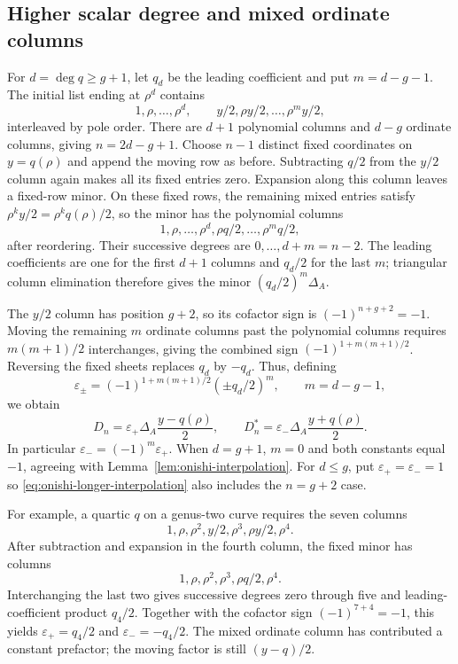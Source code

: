 \documentclass[11pt]{article}
\begin{document}
\subsection{Higher scalar degree and mixed ordinate columns}\label{sec:longer-columns}

For $d=\deg q\ge g+1$, let $q_d$ be the leading coefficient and put $m=d-g-1$. The initial list ending at $\rho^d$ contains
\[
1,\rho,\ldots,\rho^d,\qquad y/2,\rho y/2,\ldots,\rho^m y/2,
\]
interleaved by pole order. There are $d+1$ polynomial columns and $d-g$ ordinate columns, giving $n=2d-g+1$. Choose $n-1$ distinct fixed coordinates on $y=q(\rho)$ and append the moving row as before. Subtracting $q/2$ from the $y/2$ column again makes all its fixed entries zero. Expansion along this column leaves a fixed-row minor. On these fixed rows, the remaining mixed entries satisfy $\rho^k y/2=\rho^k q(\rho)/2$, so the minor has the polynomial columns
\begin{equation}\label{eq:onishi-longer-minor}
1,\rho,\ldots,\rho^d,\rho q/2,\ldots,\rho^m q/2,
\end{equation}
after reordering. Their successive degrees are $0,\ldots,d+m=n-2$. The leading coefficients are one for the first $d+1$ columns and $q_d/2$ for the last $m$; triangular column elimination therefore gives the minor $(q_d/2)^m\Delta_A$.

The $y/2$ column has position $g+2$, so its cofactor sign is $(-1)^{n+g+2}=-1$. Moving the remaining $m$ ordinate columns past the polynomial columns requires $m(m+1)/2$ interchanges, giving the combined sign $(-1)^{1+m(m+1)/2}$. Reversing the fixed sheets replaces $q_d$ by $-q_d$. Thus, defining
\begin{equation}\label{eq:onishi-longer-signs}
\varepsilon_\pm=(-1)^{1+m(m+1)/2}(\pm q_d/2)^m,\qquad m=d-g-1,
\end{equation}
we obtain
\begin{equation}\label{eq:onishi-longer-interpolation}
D_n=\varepsilon_+\Delta_A\frac{y-q(\rho)}2,\qquad
D_n^*=\varepsilon_-\Delta_A\frac{y+q(\rho)}2.
\end{equation}
In particular $\varepsilon_-=(-1)^m\varepsilon_+$. When $d=g+1$, $m=0$ and both constants equal $-1$, agreeing with Lemma~\ref{lem:onishi-interpolation}. For $d\le g$, put $\varepsilon_+=\varepsilon_-=1$ so \eqref{eq:onishi-longer-interpolation} also includes the $n=g+2$ case.

For example, a quartic $q$ on a genus-two curve requires the seven columns
\[
1,\rho,\rho^2,y/2,\rho^3,\rho y/2,\rho^4.
\]
After subtraction and expansion in the fourth column, the fixed minor has columns
\[
1,\rho,\rho^2,\rho^3,\rho q/2,\rho^4.
\]
Interchanging the last two gives successive degrees zero through five and leading-coefficient product $q_4/2$. Together with the cofactor sign $(-1)^{7+4}=-1$, this yields $\varepsilon_+=q_4/2$ and $\varepsilon_-=-q_4/2$. The mixed ordinate column has contributed a constant prefactor; the moving factor is still $(y-q)/2$.
\end{document}
